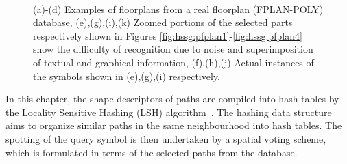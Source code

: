 \begin{figure}
\centering
\subfloat[]{\label{fig:hssg:pfplan1}\texttt{[image: p01c04]}}
\hspace{0.05cm}
\subfloat[]{\label{fig:hssg:pfplan2}\texttt{[image: p01c10]}}
\hspace{0.05cm}
\subfloat[]{\label{fig:hssg:pfplan3}\texttt{[image: p02c03]}}
\hspace{0.05cm}
\subfloat[]{\label{fig:hssg:pfplan4}\texttt{[image: p03c01]}}\\	
\subfloat[]{\label{fig:hssg:cs1}\texttt{[image: p01c04cs]}}
\hspace{0.25cm}
\hspace{0.25cm}
\subfloat[]{\label{fig:hssg:cs2}\texttt{[image: p01c10cs]}}
\hspace{0.25cm}
\hspace{0.25cm}
\subfloat[]{\label{fig:hssg:cs3}\texttt{[image: p02c03cs]}}	
\hspace{0.25cm}
\hspace{0.25cm}
\subfloat[]{\label{fig:hssg:cs4}\texttt{[image: p03c01cs]}}
\caption{(a)-(d) Examples of floorplans from a real floorplan (FPLAN-POLY) database, (e),(g),(i),(k) Zoomed portions of the selected parts respectively shown in Figures \ref{fig:hssg:pfplan1}-\ref{fig:hssg:pfplan4} show the difficulty of recognition due to noise and superimposition of textual and graphical information, (f),(h),(j) Actual instances of the symbols shown in (e),(g),(i) respectively.}
\label{fig:hssg:sampleim}
\end{figure}

In this chapter, the shape descriptors of paths are compiled into hash tables by the Locality Sensitive Hashing (LSH) algorithm~\cite{Indyk1998,Gionis1999}. The hashing data structure aims to organize similar paths in the same neighbourhood into hash tables. The spotting of the query symbol is then undertaken by a spatial voting scheme, which is formulated in terms of the selected paths from the database.

